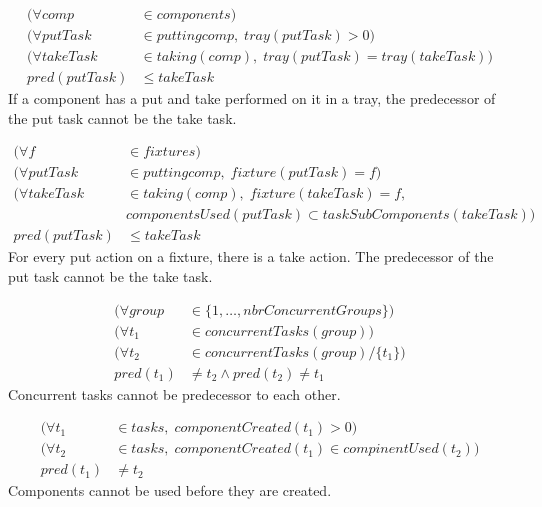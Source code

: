  
 \begin{equation}
 \begin{aligned}\label{eq:86}
 (\forall comp &\in components) \\
 (\forall putTask &\in putting{comp}, \; tray(putTask) > 0) \\
 (\forall takeTask &\in taking(comp), \; tray(putTask) = tray(takeTask)) \\
 pred(putTask) &\le takeTask
 \end{aligned}
 \end{equation}
 If a component has a put and take performed on it in a tray, the predecessor of the put task cannot be the take task.
 
 
 \begin{equation}
 \begin{aligned}\label{eq:87}
 (\forall f &\in fixtures) \\
 (\forall putTask &\in putting{comp}, \; fixture(putTask) = f) \\
 (\forall takeTask &\in taking(comp), \; fixture(takeTask) = f,\\
 &componentsUsed(putTask) \subset taskSubComponents(takeTask))\\
 pred(putTask) &\le takeTask
 \end{aligned}
 \end{equation}
 For every put action on a fixture, there is a take action. The predecessor of the put task cannot be the take task.
 
 \begin{equation}
 \begin{aligned}\label{eq:88}
 (\forall group &\in \{1 , \ldots , nbrConcurrentGroups\}) \\
 (\forall t_1 &\in concurrentTasks(group)) \\
 (\forall t_2 &\in concurrentTasks(group) / \{t_1\}) \\
 pred(t_1) &\neq t_2 \land pred(t_2) \neq t_1
 \end{aligned}
 \end{equation}
 Concurrent tasks cannot be predecessor to each other.
 
 \begin{equation}
 \begin{aligned}\label{eq:89}
 (\forall t_1 &\in tasks, \; componentCreated(t_1) > 0) \\
 (\forall t_2 &\in tasks, \; componentCreated(t_1) \in compinentUsed(t_2)) \\
 pred(t_1) &\neq t_2
 \end{aligned}
 \end{equation}
 Components cannot be used before they are created.
 
